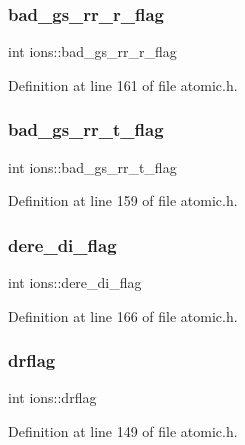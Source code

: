 \subsubsection{\texorpdfstring{bad\+\_\+gs\+\_\+rr\+\_\+r\+\_\+flag}{bad\_gs\_rr\_r\_flag}}
{\footnotesize\ttfamily int ions\+::bad\+\_\+gs\+\_\+rr\+\_\+r\+\_\+flag}



Definition at line 161 of file atomic.\+h.

\mbox{\label{structions_a64b486ba3811122938b85c5844cdb347}} 
\subsubsection{\texorpdfstring{bad\+\_\+gs\+\_\+rr\+\_\+t\+\_\+flag}{bad\_gs\_rr\_t\_flag}}
{\footnotesize\ttfamily int ions\+::bad\+\_\+gs\+\_\+rr\+\_\+t\+\_\+flag}



Definition at line 159 of file atomic.\+h.

\mbox{\label{structions_a20a27292c31febcf63bf3e2f02f18dc3}} 
\subsubsection{\texorpdfstring{dere\+\_\+di\+\_\+flag}{dere\_di\_flag}}
{\footnotesize\ttfamily int ions\+::dere\+\_\+di\+\_\+flag}



Definition at line 166 of file atomic.\+h.

\mbox{\label{structions_a62b2e0f93927161db3de868009d93d54}} 
\subsubsection{\texorpdfstring{drflag}{drflag}}
{\footnotesize\ttfamily int ions\+::drflag}



Definition at line 149 of file atomic.\+h.

